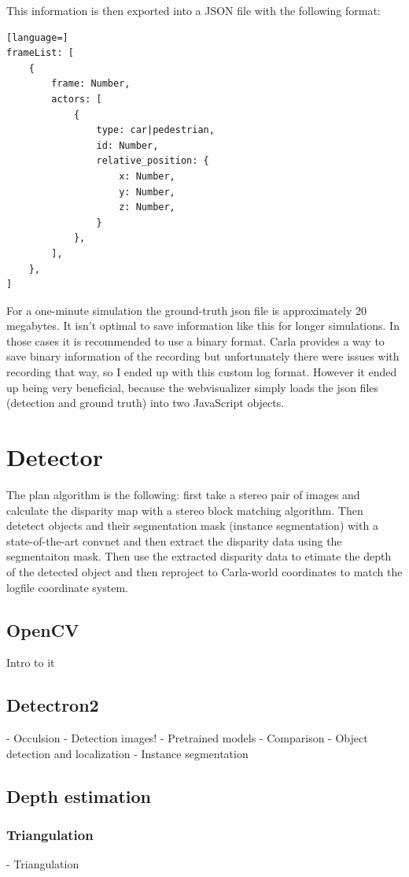 This information is then exported into a JSON file with the following format:
\begin{lstlisting}[language=]
frameList: [
    {
        frame: Number,
        actors: [
            {
                type: car|pedestrian,
                id: Number,
                relative_position: {
                    x: Number,
                    y: Number,
                    z: Number,
                }
            },
        ],
    },
]
\end{lstlisting}

For a one-minute simulation the ground-truth json file is approximately 20
megabytes. It isn't optimal to save information like this for longer
simulations. In those cases it is recommended to use a binary format. Carla
provides a way to save binary information of the recording but unfortunately
there were issues with recording that way, so I ended up with this custom log
format. However it ended up being very beneficial, because the webvisualizer
simply loads the json files (detection and ground truth) into two JavaScript
objects.

\section{Detector}

The plan algorithm is the following: first take a stereo pair of images and
calculate the disparity map with a stereo block matching algorithm. Then
detetect objects and their segmentation mask (instance segmentation) with a
state-of-the-art convnet and then extract the disparity data using the
segmentaiton mask. Then use the extracted disparity data to etimate the depth of
the detected object and then reproject to Carla-world coordinates to match the
logfile coordinate system.


\subsection{OpenCV}
Intro to it
\subsection{Detectron2}
- Occulsion
- Detection images!
- Pretrained models
- Comparison
- Object detection and localization
- Instance segmentation
\subsection{Depth estimation}
\subsubsection{Triangulation}
- Triangulation
